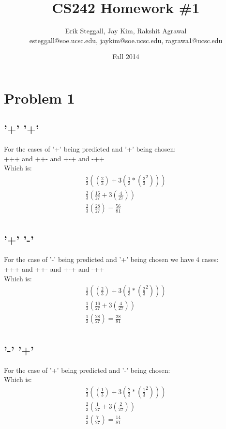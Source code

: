 \documentclass{article}
\title{CS242 Homework \#1}
\author{Erik Steggall, Jay Kim, Rakshit Agrawal \\ esteggall@soe.ucsc.edu, jaykim@soe.ucsc.edu, ragrawa1@ucsc.edu}
\date{Fall 2014}
\begin{document}
 \maketitle \pagestyle{empty}
\section*{Problem 1}

\subsection*{'+' '+'}
For the cases of '+' being predicted and '+' being chosen:\\ 
+++ and ++- and +-+ and -++\\
Which is:\\
\begin{align}
\frac{2}{3}((\frac{2}{3}) + 3 (\frac{1}{3} * (\frac{2}{3}^2)))\\
\frac{2}{3}(\frac{16}{27} + 3(\frac{4}{27}))\\
\frac{2}{3}(\frac{28}{27}) = \frac{56}{81}\\
\end{align}
\subsection*{'+' '-'}
For the case of '-' being predicted and '+' being chosen we have 4 cases:\\
+++ and ++- and +-+ and -++\\
Which is:\\
\begin{align}
\frac{1}{3}((\frac{2}{3}) + 3 (\frac{1}{3} * (\frac{2}{3}^2)))\\
\frac{1}{3}(\frac{16}{27} + 3(\frac{4}{27}))\\
\frac{1}{3}(\frac{28}{27}) = \frac{28}{81}\\
\end{align}

\subsection*{'-' '+'}
For the case of '+' being predicted and '-'  being chosen:\\
Which is:\\
\begin{align}
\frac{2}{3}((\frac{1}{3}) + 3 (\frac{2}{3} * (\frac{1}{3}^2)))\\
\frac{2}{3}(\frac{1}{27} + 3(\frac{2}{27}))\\
\frac{2}{3}(\frac{7}{27}) = \frac{14}{81}\\
\end{align}
\end{document}
